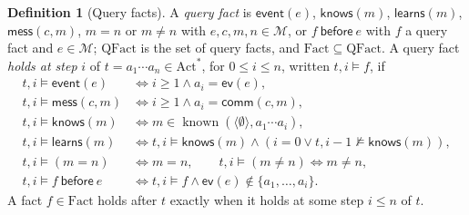 \documentclass[11pt]{article}
\theoremstyle{definition}
\newtheorem{definition}{Definition}[section]
\theoremstyle{plain}
\theoremstyle{remark}
\newcommand{\Act}{\mathrm{Act}}
\newcommand{\known}{\operatorname{known}}
\newcommand{\Fact}{\mathrm{Fact}}
\begin{document}
\begin{definition}[Query facts]\label{def:qfacts}
A \emph{query fact} is $\mathsf{event}(e)$, $\mathsf{knows}(m)$, $\mathsf{learns}(m)$, $\mathsf{mess}(c,m)$, $m=n$ or $m\ne n$ with $e,c,m,n\in\mathcal{M}$, or $f\ \mathsf{before}\ e$ with $f$ a query fact and $e\in\mathcal{M}$; $\mathrm{QFact}$ is the set of query facts, and $\Fact\subseteq\mathrm{QFact}$. A query fact \emph{holds at step} $i$ of $t=a_1\cdots a_n\in\Act^*$, for $0\le i\le n$, written $t,i\models f$, if
\begin{align*}
t,i\models\mathsf{event}(e)&\iff i\ge1\wedge a_i=\mathsf{ev}(e),\\
t,i\models\mathsf{mess}(c,m)&\iff i\ge1\wedge a_i=\mathsf{comm}(c,m),\\
t,i\models\mathsf{knows}(m)&\iff m\in\known(\langle\emptyset\rangle,a_1\cdots a_i),\\
t,i\models\mathsf{learns}(m)&\iff t,i\models\mathsf{knows}(m)\wedge(i=0\vee t,i-1\not\models\mathsf{knows}(m)),\\
t,i\models(m=n)&\iff m=n,\qquad t,i\models(m\ne n)\iff m\ne n,\\
t,i\models f\ \mathsf{before}\ e&\iff t,i\models f\wedge\mathsf{ev}(e)\notin\{a_1,\dots,a_i\}.
\end{align*}
A fact $f\in\Fact$ holds after $t$ exactly when it holds at some step $i\le n$ of $t$.
\end{definition}
\end{document}
